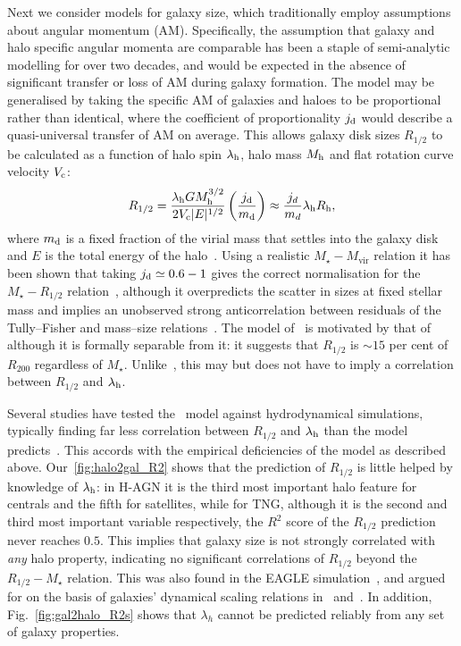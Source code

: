 \documentclass[usenatbib,useAMS]{mnras}
\begin{document}
Next we consider models for galaxy size, which traditionally employ assumptions about angular momentum (AM). Specifically, the assumption that galaxy and halo specific angular momenta are comparable has been a staple of semi-analytic modelling for over two decades, and would be expected in the absence of significant transfer or loss of AM during galaxy formation. The model may be generalised by taking the specific AM of galaxies and haloes to be proportional rather than identical, where the coefficient of proportionality $j_{\rm d}$ would describe a quasi-universal transfer of AM on average. This allows galaxy disk sizes $R_{1/2}$ to be calculated as a function of halo spin $\lambda_{\rm h}$, halo mass $M_{\rm h}$ and flat rotation curve velocity $V_{\rm c}$:
\begin{equation}\label{eq:MMW}
    R_{1/2} = \frac{\lambda_{\rm h} G M_{\rm h}^{3/2}}{2 V_{\rm c} |E|^{1/2}}\left(\frac{j_{\rm d}}{m_{\rm d}}\right) \approx \frac{j_d}{m_d} \lambda_{\rm h} R_{\rm h},
\end{equation}
where $m_{\rm d}$ is a fixed fraction of the virial mass that settles into the galaxy disk and $E$ is the total energy of the halo~\citep{MMW_1998}. Using a realistic $M_\star-M_\text{vir}$ relation it has been shown that taking $j_{\rm d}\simeq0.6-1$ gives the correct normalisation for the $M_\star-R_{1/2}$ relation~\citep{Desmond_Wechsler_2015, Posti, Pina}, although it overpredicts the scatter in sizes at fixed stellar mass and implies an unobserved strong anticorrelation between residuals of the Tully--Fisher and mass--size relations~\citep{de_Jong_2000,Gnedin_2007,Desmond_Wechsler_2015,Desmond_2019}. The model of~\citet{Kravtsov_2013} is motivated by that of~\citeauthor{MMW_1998} although it is formally separable from it: it suggests that $R_{1/2}$ is $\sim15$ per cent of $R_\text{200}$ regardless of $M_\star$. Unlike~\citeauthor{MMW_1998}, this may but does not have to imply a correlation between $R_{1/2}$ and $\lambda_{\rm h}$.

Several studies have tested the~\citeauthor{MMW_1998} model against hydrodynamical simulations, typically finding far less correlation between $R_{1/2}$ and $\lambda_{\rm h}$ than the model predicts~\citep{Sales_2009, Sales_2012, Stevens, Desmond_2017,Jiang_2019,Yang_2021,Rohr}. This accords with the empirical deficiencies of the model as described above. Our~\cref{fig:halo2gal_R2} shows that the prediction of $R_{1/2}$ is little helped by knowledge of $\lambda_{\rm h}$: in H-AGN it is the third most important halo feature for centrals and the fifth for satellites, while for TNG, although it is the second and third most important variable respectively, the $R^2$ score of the $R_{1/2}$ prediction never reaches $0.5$. This implies that galaxy size is not strongly correlated with \emph{any} halo property, indicating no significant correlations of $R_{1/2}$ beyond the $R_{1/2}-M_\star$ relation. This was also found in the EAGLE simulation~\citep{Desmond_2017}, and argued for on the basis of galaxies' dynamical scaling relations in~\citet{Desmond_MDAR} and~\citet{Desmond_2019}. In addition, Fig.~\ref{fig:gal2halo_R2s} shows that $\lambda_h$ cannot be predicted reliably from any set of galaxy properties.
\end{document}
